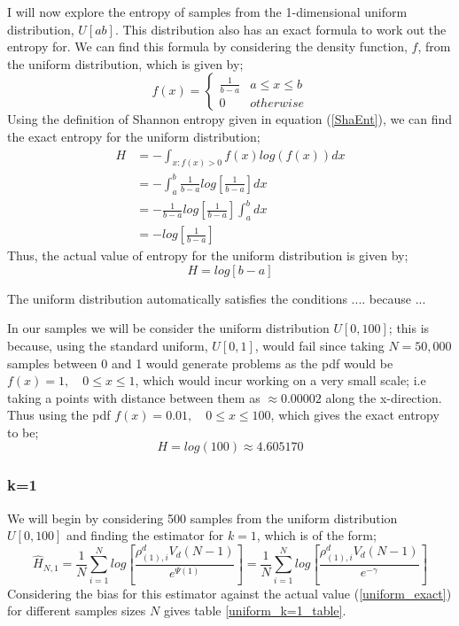 \documentclass{article}
\begin{document}
I will now explore the entropy of samples from the 1-dimensional uniform distribution, $U[a b]$. This distribution also has an exact formula to work out the entropy for. We can find this formula by considering the density function, $f$, from the uniform distribution, which is given by;
\[
f(x) =  \begin{cases} 
      \frac{1}{b-a} & a \leq x \leq b \\
      0 & otherwise
   \end{cases}
\]
Using the definition of Shannon entropy given in equation (\ref{ShaEnt}), we can find the exact entropy for the uniform distribution;
\begin{align}
H &= - \int_{x : f(x) > 0} f(x) log(f(x)) dx \nonumber \\ 
&= - \int_{a}^{b} \frac{1}{b-a} log \left[ \frac{1}{b-a} \right] dx \nonumber \\
&= - \frac{1}{b-a} log \left[ \frac{1}{b-a} \right]  \int_{a}^{b} dx \nonumber \\
&= -  log  \left[ \frac{1}{b-a} \right] \nonumber
\end{align}
Thus, the actual value of entropy for the uniform distribution is given by;
\begin{equation} \label{UnifEnt}
H = log [ b-a ]
\end{equation}

The uniform distribution automatically satisfies the conditions .... because ... 

In our samples we will be consider the uniform distribution $U[0,100]$; this is because, using the standard uniform, $U[0,1]$, would fail since taking $N=50,000$ samples between 0 and 1 would generate problems as the pdf would be $f(x) = 1 , \quad 0 \leq x \leq 1$, which would incur working on a very small scale; i.e taking a points with distance between them as $\approx 0.00002$ along the x-direction. Thus using the pdf $f(x) = 0.01 , \quad 0 \leq x \leq 100$, which gives the exact entropy to be;
\begin{equation} \label{uniform_exact}
H = log(100) \approx 4.605170
\end{equation}

\subsubsection{k=1} \label{U_k=1}

We will begin by considering 500 samples from the uniform distribution $U[0,100]$ and finding the estimator for $k=1$, which is of the form;
\begin{equation} 
\hat{H}_{N, 1} = \frac{1}{N} \sum_{i=1}^{N} log \left[ \frac{\rho_{(1),i}^{d} V_{d} (N-1)}{e^{\Psi(1)}} \right] = \frac{1}{N} \sum_{i=1}^{N} log \left[ \frac{\rho_{(1),i}^{d} V_{d} (N-1)}{e^{-\gamma}} \right] \nonumber
\end{equation}
Considering the bias for this estimator against the actual value (\ref{uniform_exact}) for different samples sizes $N$ gives table \ref{uniform_k=1_table}.
\end{document}
